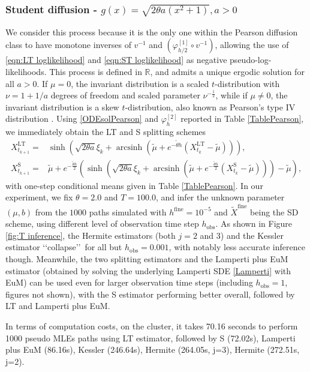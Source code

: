 \documentclass[a4paper,12pt]{article}
\numberwithin{equation}{section}
\theoremstyle{plain}
\theoremstyle{definition}
\begin{document}
\subsubsection{Student diffusion - $g(x)=\sqrt{2\theta a(x^2+1)},  a>0$}
We consider this process because it is the only one within the Pearson diffusion class to have monotone inverses of $v^{-1}$ and $(\varphi_{h/2}^{[1]}\circ v^{-1})$, allowing the use of \eqref{eqn:LT loglikelihood} and \eqref{eqn:ST loglikelihood} as negative pseudo-log-likelihoods. This process is defined in $\mathbb{R}$, and admits a unique ergodic solution for all $a>0$. 
If $\mu=0$, the invariant distribution is a scaled $t$-distribution with $\nu=1+1/a$ degrees of freedom and scaled parameter $\nu^{-\frac{1}{2}}$, while if $\mu \neq 0$, the invariant distribution is a skew $t$-distribution, also known as  Pearson's type IV distribution \cite{forman_pearson_2008}. Using \eqref{ODEsolPearson} and $\varphi^{[2]}_h$ reported in Table \ref{TablePearson}, we immediately obtain the LT and S splitting schemes
\begin{align*}
X^{\textrm{LT}}_{t_{k+1}}=&\sinh\left(\sqrt{2\theta a }
\xi_k+\operatorname{arcsinh}\left(\tilde{\mu}+e^{-\tilde{\theta}h}\left(X^{\textrm{LT}}_{t_k}-\tilde{\mu}\right)\right)\right),\\
    X^{\textrm{S}}_{t_{k+1}}=&\tilde{\mu}+e^{-\frac{\tilde{\theta}h}{2}}\left(\sinh\left(\sqrt{2\theta a }\xi_k+\operatorname{arcsinh}\left(\tilde{\mu}+e^{-\frac{\tilde{\theta}h}{2}}\left(X^{\textrm{S}}_{t_k}-\tilde{\mu}\right)\right)\right)-\tilde{\mu}\right),
\end{align*}
with one-step conditional means given in Table \ref{TablePearson}.
In our experiment, we fix $\theta=2.0$ and $T=100.0$, and infer the unknown parameter $(\mu,b)$ from the $1000$ paths simulated with $h^\textrm{fine}=10^{-5}$ and $\widetilde X^{\textrm{fine}}$ being the SD scheme, using different level of observation time step $h_\textrm{obs}$. As shown in Figure \ref{fig:T inference}, the Hermite estimators (both $j=2$ and $3$) and the Kessler estimator \lq\lq collapse\rq\rq\ for all but $h_\textrm{obs}=0.001$, with notably less accurate inference though. Meanwhile, the two splitting estimators and the Lamperti plus EuM estimator (obtained by solving the underlying Lamperti SDE \eqref{Lamperti} with EuM) can be used even for larger observation time steps (including $h_\textrm{obs}=1$, figures not shown), with the S estimator performing better overall, followed by LT and Lamperti plus EuM. 

In terms of computation costs, on the cluster, it takes 70.16 seconds to perform 1000 pseudo MLEs  paths using LT estimator, followed by S (72.02s), Lamperti plus EuM (86.16s), Kessler (246.64s), Hermite (264.05s, j=3), Hermite (272.51s, j=2).
\end{document}
